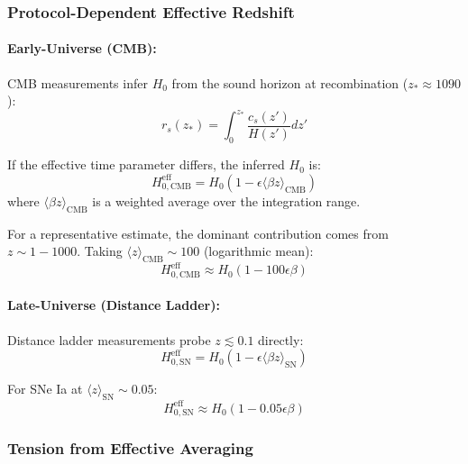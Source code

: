 \subsubsection{Protocol-Dependent Effective Redshift}

\paragraph{Early-Universe (CMB):}
CMB measurements infer $H_0$ from the sound horizon at recombination ($z_* \approx 1090$):
\begin{equation}
r_s(z_*) = \int_0^{z_*} \frac{c_s(z')}{H(z')} dz'
\label{eq:sound_horizon}
\end{equation}

If the effective time parameter differs, the inferred $H_0$ is:
\begin{equation}
H_{0,\text{CMB}}^{\text{eff}} = H_0 \left(1 - \epsilon \langle \beta z \rangle_{\text{CMB}}\right)
\label{eq:h0_cmb_eff}
\end{equation}
where $\langle \beta z \rangle_{\text{CMB}}$ is a weighted average over the integration range.

For a representative estimate, the dominant contribution comes from $z \sim 1-1000$. Taking $\langle z \rangle_{\text{CMB}} \sim 100$ (logarithmic mean):
\begin{equation}
H_{0,\text{CMB}}^{\text{eff}} \approx H_0 (1 - 100 \epsilon \beta)
\label{eq:h0_cmb_approx}
\end{equation}

\paragraph{Late-Universe (Distance Ladder):}
Distance ladder measurements probe $z \lesssim 0.1$ directly:
\begin{equation}
H_{0,\text{SN}}^{\text{eff}} = H_0 \left(1 - \epsilon \langle \beta z \rangle_{\text{SN}}\right)
\label{eq:h0_sn_eff}
\end{equation}

For SNe Ia at $\langle z \rangle_{\text{SN}} \sim 0.05$:
\begin{equation}
H_{0,\text{SN}}^{\text{eff}} \approx H_0 (1 - 0.05 \epsilon \beta)
\label{eq:h0_sn_approx}
\end{equation}

\subsubsection{Tension from Effective Averaging}

